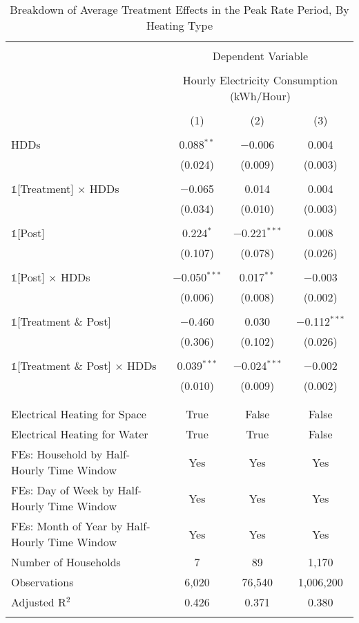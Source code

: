 
\begin{table}[!htbp] \centering 
  \caption{Breakdown of Average Treatment Effects in the Peak Rate Period, By Heating Type} 
  \label{Table:Breakdown-of-Average-Treatment-Effects-in-the-Peak-Rate-Period_By-Heating-Type} 
\small 
\begin{tabular}{@{\extracolsep{20pt}}lccc} 
\\[-1.8ex]\hline 
\hline \\[-1.8ex] 
 & \multicolumn{3}{c}{Dependent Variable} \\ 
\cline{2-4} 
\\[-1.8ex] & \multicolumn{3}{c}{Hourly Electricity Consumption  (kWh/Hour)} \\ 
\\[-1.8ex] & (1) & (2) & (3)\\ 
\hline \\[-1.8ex] 
 HDDs & 0.088$^{**}$ & $-$0.006 & 0.004 \\ 
  & (0.024) & (0.009) & (0.003) \\ 
  & & & \\ 
 $\mathbb{1}$[Treatment] $\times$ HDDs & $-$0.065 & 0.014 & 0.004 \\ 
  & (0.034) & (0.010) & (0.003) \\ 
  & & & \\ 
 $\mathbb{1}$[Post] & 0.224$^{*}$ & $-$0.221$^{***}$ & 0.008 \\ 
  & (0.107) & (0.078) & (0.026) \\ 
  & & & \\ 
 $\mathbb{1}$[Post] $\times$ HDDs & $-$0.050$^{***}$ & 0.017$^{**}$ & $-$0.003 \\ 
  & (0.006) & (0.008) & (0.002) \\ 
  & & & \\ 
 $\mathbb{1}$[Treatment \& Post] & $-$0.460 & 0.030 & $-$0.112$^{***}$ \\ 
  & (0.306) & (0.102) & (0.026) \\ 
  & & & \\ 
 $\mathbb{1}$[Treatment \& Post] $\times$ HDDs & 0.039$^{***}$ & $-$0.024$^{***}$ & $-$0.002 \\ 
  & (0.010) & (0.009) & (0.002) \\ 
  & & & \\ 
\hline \\[-1.8ex] 
Electrical Heating for Space & True & False & False \\ 
Electrical Heating for Water & True & True & False \\ 
FEs: Household by Half-Hourly Time Window & Yes & Yes & Yes \\ 
FEs: Day of Week by Half-Hourly Time Window & Yes & Yes & Yes \\ 
FEs: Month of Year by Half-Hourly Time Window & Yes & Yes & Yes \\ 
Number of Households &     7 &    89 & 1,170 \\ 
Observations & 6,020 & 76,540 & 1,006,200 \\ 
Adjusted R$^{2}$ & 0.426 & 0.371 & 0.380 \\ 
\hline 
\hline \\[-1.8ex] 
\end{tabular} 
\end{table} 
